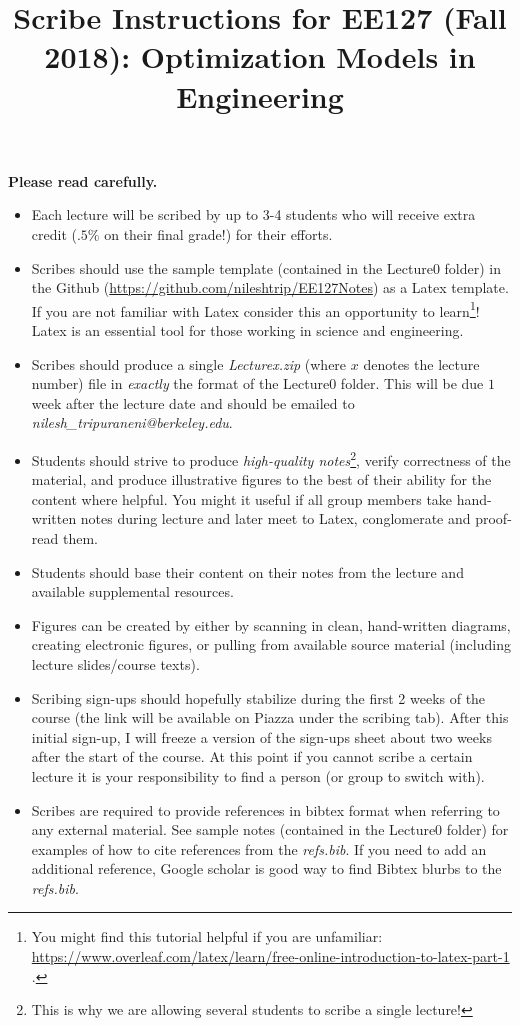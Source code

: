 \documentclass[12pt]{article}
\title{Scribe Instructions for EE127 (Fall 2018): Optimization Models in Engineering}
\date{}
\begin{document}
\maketitle

{\bf\color{red} Please read carefully.}

\begin{itemize}
\item Each lecture will be scribed by up to 3-4 students who will receive extra credit ($.5 \%$ on their final grade!) for their efforts.

\item Scribes should use the sample template (contained in the Lecture0 folder) in the Github (\url{https://github.com/nileshtrip/EE127Notes}) as a Latex template. If you are not familiar with Latex consider this an opportunity to learn\footnote{You might find this tutorial helpful if you are unfamiliar: \url{https://www.overleaf.com/latex/learn/free-online-introduction-to-latex-part-1} .}! Latex is an essential tool for those working in science and engineering.

\item Scribes should produce a single \emph{Lecturex.zip} (where $x$ denotes the lecture number) file in \textit{exactly} the format of the Lecture0 folder. This will be due $1$ week after the lecture date and should be emailed to \emph{nilesh\_tripuraneni@berkeley.edu}.

\item Students should strive to produce \textit{high-quality notes}\footnote{This is why we are allowing several students to scribe a single lecture!}, verify correctness of the material, and produce illustrative figures to the best of their ability for the content where helpful. You might it useful if all group members take hand-written notes during lecture and later meet to Latex, conglomerate and proof-read them.

\item Students should base their content on their notes from the lecture and available supplemental resources.

\item Figures can be created by either by scanning in clean, hand-written diagrams, creating electronic figures, or pulling from available source material (including lecture slides/course texts).

\item Scribing sign-ups should hopefully stabilize during the first 2 weeks of the course (the link will be available on Piazza under the scribing tab). After this initial sign-up, I will freeze a version of the sign-ups sheet about two weeks after the start of the course. At this point if you cannot scribe a certain lecture it is your responsibility to find a person (or group to switch with).
\item Scribes are required to provide references in bibtex format when referring to any external material. See sample notes (contained in the Lecture0 folder) for examples of how to cite references from the \emph{refs.bib}. If you need to add an additional reference, Google scholar is good way to find Bibtex blurbs to the \emph{refs.bib}.
\end{itemize}
\end{document}
